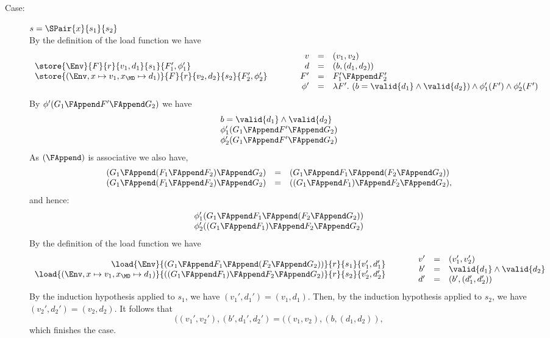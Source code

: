 {\begin{description}
\item[Case:] $s = \SPair{x}{s_1}{s_2}$\\[1ex]
%
By the definition of the load function we have
\[
\begin{array}{l}
\store{\Env}{F}{r}{v_1,d_1}{s_1}{F_1',\phi_1'}\\
\store{(\Env, x \mapsto v_1, x_{\MD} \mapsto d_1)}{F}{r}{v_2,d_2}{s_2}{F_2',\phi_2'}\\
\end{array}\hspace*{1cm}\begin{array}{rcl}
v &=& (v_1,v_2)\\
d &=& (b,(d_1,d_2))\\
F' &=& F_1' \FAppend F_2'\\
\phi' &=& \lambda F'.~(b = \valid{d_1} \wedge \valid{d_2}) \wedge \phi_1'(F') \wedge \phi_2'(F')\\
\end{array}
\]
By $\phi'(G_1 \FAppend F' \FAppend G_2)$ we have
\[
\begin{array}{l}
b = \valid{d_1} \wedge \valid{d_2}\\
\phi_1'(G_1 \FAppend F' \FAppend G_2)\\
\phi_2'(G_1 \FAppend F' \FAppend G_2)\\
\end{array}
\]
%
As $(\FAppend)$ is associative we also have,
\[
\begin{array}{rcl}
(G_1\FAppend (F_1\FAppend F_2)\FAppend G_2) &=& (G_1\FAppend F_1\FAppend (F_2\FAppend G_2))\\
(G_1\FAppend (F_1\FAppend F_2)\FAppend G_2) &=& ((G_1\FAppend F_1)\FAppend F_2\FAppend G_2),\\
\end{array}
\]
and hence:
\[
\begin{array}{l}
\phi_1'(G_1\FAppend F_1\FAppend (F_2\FAppend G_2))\\
\phi_2'((G_1\FAppend F_1)\FAppend F_2\FAppend G_2)\\
\end{array}
\]
By the definition of the load function we have 
\[ 
\begin{array}{rcll}
\load{\Env}{(G_1 \FAppend F_1 \FAppend (F_2 \FAppend G_2))}{r}{s_1}{v_1',d_1'}\\
\load{(\Env, x \mapsto v_1, x_{\MD} \mapsto d_1)}{((G_1 \FAppend F_1) \FAppend F_2 \FAppend G_2)}{r}{s_2}{v_2',d_2'}\\
\end{array}\hspace*{1cm}\begin{array}{rcl}
v' &=& (v_1',v_2')\\
b' &= & \valid{d_1} \wedge \valid{d_2}\\
d' &=& (b',(d_1',d_2'))\\
\end{array}
\]
%
By the induction hypothesis applied to $s_1$, we have $(v_1',d_1') =
(v_1,d_1)$.  Then, by the induction hypothesis applied to $s_2$, we
have $(v_2',d_2') = (v_2,d_2)$.  It follows that
%
\[
((v_1',v_2'), (b',d_1',d_2') = ((v_1,v_2), (b, (d_1,d_2)),
\]
%
which finishes the case. 


\end{description}}
